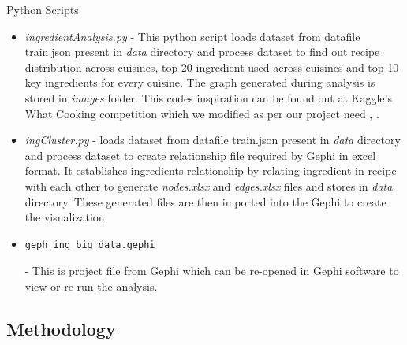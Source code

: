 \documentclass[sigconf]{acmart}
\begin{document}
Python Scripts
\begin{itemize}
\item \emph{ingredientAnalysis.py} - This python script loads dataset from datafile train.json present in \emph{data} directory and process dataset to find out recipe distribution across cuisines, top 20 ingredient used across cuisines and top 10 key ingredients for every cuisine. The graph generated during analysis is stored in \emph{images} folder. This codes inspiration can be found out at Kaggle's What Cooking competition which we modified as per our project need \cite{www-kaggle-ingten}, \cite{www-www-kaggle-ingtenbyc}.
\item \emph{ingCluster.py} - loads dataset from datafile train.json present in \emph{data} directory and process dataset to create relationship file required by Gephi in excel format. It establishes ingredients relationship by relating ingredient in recipe with each other to generate \emph{nodes.xlsx} and \emph{edges.xlsx} files and stores in \emph{data} directory. These generated files are then imported into the Gephi to create the visualization.
\item \begin{verbatim}geph_ing_big_data.gephi\end{verbatim} - This is project file from Gephi which can be re-opened in Gephi software to view or re-run the analysis.
\end{itemize}

\subsection{Methodology}
\end{document}
